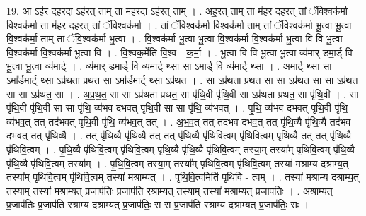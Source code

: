 \documentclass[17pt]{extarticle}
\begin{document}
19. आ ऽह॑र दहर॒दा ऽह॑र॒त् ताम् ता म॑हर॒दा ऽह॑र॒त् ताम् । . अ॒ह॒र॒त् ताम् ता म॑हर दहर॒त् तां ॅवि॒श्वक॑र्मा वि॒श्वक॑र्मा॒ ता म॑हर दहर॒त् तां ॅवि॒श्वक॑र्मा । . तां ॅवि॒श्वक॑र्मा वि॒श्वक॑र्मा॒ ताम् तां ॅवि॒श्वक॑र्मा भू॒त्वा भू॒त्वा वि॒श्वक॑र्मा॒ ताम् तां ॅवि॒श्वक॑र्मा भू॒त्वा । . वि॒श्वक॑र्मा भू॒त्वा भू॒त्वा वि॒श्वक॑र्मा वि॒श्वक॑र्मा भू॒त्वा वि वि भू॒त्वा वि॒श्वक॑र्मा वि॒श्वक॑र्मा भू॒त्वा वि । . वि॒श्वक॒र्मेति॑ वि॒श्व - क॒र्मा॒ । . भू॒त्वा वि वि भू॒त्वा भू॒त्वा व्य॑मार् डमा॒र्ड् वि भू॒त्वा भू॒त्वा व्य॑मार्ट् । . व्य॑मार् डमा॒र्ड् वि व्य॑मार्ट् थ्सा सा ऽमा॒र्ड् वि व्य॑मार्ट् थ्सा । . अ॒मा॒र्ट् थ्सा सा ऽमा᳚र्डमार्ट् थ्सा ऽप्र॑थता प्रथत॒ सा ऽमा᳚र्डमार्ट् थ्सा ऽप्र॑थत । . सा ऽप्र॑थता प्रथत॒ सा सा ऽप्र॑थत॒ सा सा ऽप्र॑थत॒ सा सा ऽप्र॑थत॒ सा । . अ॒प्र॒थ॒त॒ सा सा ऽप्र॑थता प्रथत॒ सा पृ॑थि॒वी पृ॑थि॒वी सा ऽप्र॑थता प्रथत॒ सा पृ॑थि॒वी । . सा पृ॑थि॒वी पृ॑थि॒वी सा सा पृ॑थि॒ व्य॑भव दभवत् पृथि॒वी सा सा पृ॑थि॒ व्य॑भवत् । . पृ॒थि॒ व्य॑भव दभवत् पृथि॒वी पृ॑थि॒ व्य॑भव॒त् तत् तद॑भवत् पृथि॒वी पृ॑थि॒ व्य॑भव॒त् तत् । . अ॒भ॒व॒त् तत् तद॑भव दभव॒त् तत् पृ॑थि॒व्यै पृ॑थि॒व्यै तद॑भव दभव॒त् तत् पृ॑थि॒व्यै । . तत् पृ॑थि॒व्यै पृ॑थि॒व्यै तत् तत् पृ॑थि॒व्यै पृ॑थिवि॒त्वम् पृ॑थिवि॒त्वम् पृ॑थि॒व्यै तत् तत् पृ॑थि॒व्यै पृ॑थिवि॒त्वम् । . पृ॒थि॒व्यै पृ॑थिवि॒त्वम् पृ॑थिवि॒त्वम् पृ॑थि॒व्यै पृ॑थि॒व्यै पृ॑थिवि॒त्वम् तस्या॒म् तस्या᳚म् पृथिवि॒त्वम् पृ॑थि॒व्यै पृ॑थि॒व्यै पृ॑थिवि॒त्वम् तस्या᳚म् । . पृ॒थि॒वि॒त्वम् तस्या॒म् तस्या᳚म् पृथिवि॒त्वम् पृ॑थिवि॒त्वम् तस्या॑ मश्राम्य दश्राम्य॒त् तस्या᳚म् पृथिवि॒त्वम् पृ॑थिवि॒त्वम् तस्या॑ मश्राम्यत् । . पृ॒थि॒वि॒त्वमिति॑ पृथिवि - त्वम् । . तस्या॑ मश्राम्य दश्राम्य॒त् तस्या॒म् तस्या॑ मश्राम्यत् प्र॒जाप॑तिः प्र॒जाप॑ति रश्राम्य॒त् तस्या॒म् तस्या॑ मश्राम्यत् प्र॒जाप॑तिः । . अ॒श्रा॒म्य॒त् प्र॒जाप॑तिः प्र॒जाप॑ति रश्राम्य दश्राम्यत् प्र॒जाप॑तिः॒ स स प्र॒जाप॑ति रश्राम्य दश्राम्यत् प्र॒जाप॑तिः॒ सः । \newline
\end{document}
